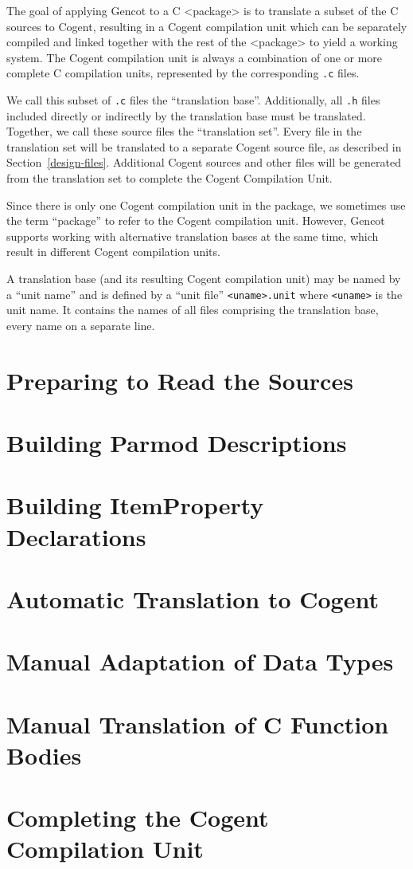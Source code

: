 \documentclass[a4paper]{report}
\newcommand{\code}[1]{\textnormal{\texttt{#1}}}
\begin{document}
The goal of applying Gencot to a C <package> is to translate a subset of the C sources to Cogent,
resulting in a Cogent compilation unit which can be separately compiled and linked together with
the rest of the <package> to yield a working system. The Cogent compilation unit is always a
combination of one or more complete C compilation units, represented by the corresponding \code{.c} 
files.

We call this subset of \code{.c} files the ``translation base''. Additionally, all \code{.h} files
included directly or indirectly by the translation base must be translated. Together, we call these
source files the ``translation set''. Every file in the translation set will be translated to a 
separate Cogent source file, as described in Section~\ref{design-files}. Additional Cogent sources
and other files will be generated from the translation set to complete the Cogent Compilation Unit.

Since there is only one Cogent compilation unit in the package, we sometimes use the term ``package''
to refer to the Cogent compilation unit. However, Gencot supports working with alternative 
translation bases at the same time, which result in different Cogent compilation units.

A translation base (and its resulting Cogent compilation unit) may be named by a ``unit name'' and
is defined by a ``unit file'' \code{<uname>.unit} where \code{<uname>} is the unit name. It contains 
the names of all files comprising the translation base, every name on a separate line. 

\section{Preparing to Read the Sources}
\label{app-prep}
%

\section{Building Parmod Descriptions}
\label{app-parmod}


\section{Building ItemProperty Declarations}
\label{app-itemprops}


\section{Automatic Translation to Cogent}
\label{app-transauto}


\section{Manual Adaptation of Data Types}
\label{app-transtype}


\section{Manual Translation of C Function Bodies}
\label{app-transfunction}


\section{Completing the Cogent Compilation Unit}
\label{app-unit}
%
\end{document}
